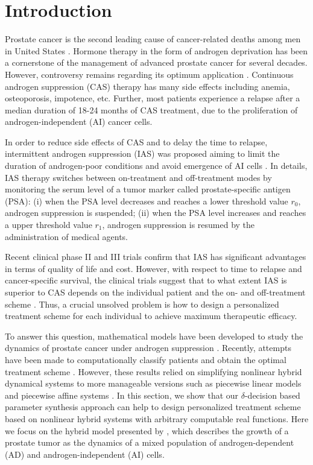 \section{Introduction}
Prostate cancer is the second leading cause of cancer-related deaths among men in United States \citep{cancerstat}. Hormone therapy in the form of androgen deprivation has been a cornerstone of the management of advanced prostate cancer for several decades. However, controversy remains regarding its optimum application \citep{nru}. Continuous androgen suppression (CAS) therapy has many side effects including anemia, osteoporosis, impotence, etc. Further, most patients experience a relapse after a median duration of 18-24 months of CAS treatment, due to the proliferation of androgen-independent (AI) cancer cells.

In order to reduce side effects of CAS and to delay the time to relapse, intermittent androgen suppression (IAS) was proposed aiming to limit the duration of androgen-poor conditions and avoid emergence of AI cells \citep{bruchovsky95}. In details, IAS therapy switches between on-treatment and off-treatment modes by monitoring the serum level of a tumor marker called prostate-specific antigen (PSA):  (i) when the PSA level decreases and reaches a lower threshold value $r_0$, androgen suppression is suspended; (ii) when the PSA level increases and reaches a upper threshold value $r_1$, androgen suppression is resumed by the administration of medical agents.

Recent clinical phase II and III trials confirm that IAS has significant advantages in terms of quality of life and cost. However, with respect to time to relapse and cancer-specific survival, the clinical trials suggest that to what extent IAS is superior to CAS depends on the individual patient and the on- and off-treatment scheme \citep{bruchovsky06,bruchovsky07,book13}. Thus, a crucial unsolved problem is how to design a personalized treatment scheme for each individual to achieve maximum therapeutic efficacy.

To answer this question, mathematical models have been developed to study the dynamics of prostate cancer under androgen suppression \citep{jackson04,ideta08, hirata10,pnas11}. Recently, attempts have been made to computationally classify patients and obtain the optimal treatment scheme \citep{chaos10,suzuki10}. However, these results relied on simplifying nonlinear hybrid dynamical systems to more manageable versions such as piecewise linear models \citep{chaos10} and piecewise affine systems \citep{suzuki10}. In this section, we show that our $\delta$-decision based parameter synthesis approach can help to design personalized treatment scheme based on nonlinear hybrid systems with arbitrary computable real functions. Here we focus on the hybrid model presented by \cite{ideta08}, which describes the growth of a prostate tumor as the dynamics of a mixed population of androgen-dependent (AD) and androgen-independent (AI) cells.

